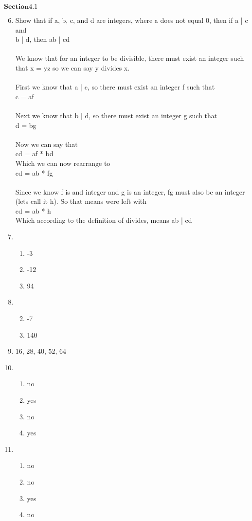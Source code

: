 \documentclass[12pt, letter paper]{article}
\begin{document}
$\mathbf{Section 4.1}$
\begin{enumerate}
	\setcounter{enumi}{5}
	\item Show that if a, b, c, and d are integers, where a does not equal 0, then if  a | c and\\ b | d, then ab | cd
	\\
	\\We know that for an integer to be divisible, there must exist an integer such that x = yz so we can say y 		divides x.
	\\
	\\First we know that a | c, so there must exist an integer f such that
	\\c = af
	\\
	\\Next we know that b | d, so there must exist an integer g such that
	\\d = bg
	\\
	\\Now we can say that 
	\\cd = af * bd
	\\Which we can now rearrange to
	\\cd = ab * fg
	\\
	\\Since we know f is and integer and g is an integer, fg must also be an integer (lets call it h). So that means 	were left with
	\\cd = ab * h
	\\Which according to the definition of divides, means ab | cd
	
	\setcounter{enumi}{23}
	\item
	\begin{enumerate}
		\item -3
		\item -12
		\item 94
	\end{enumerate}
	
	\item
	\begin{enumerate}
		\setcounter{enumii}{1}
		\item -7
		\item 140
	\end{enumerate}
	
	\item 16, 28, 40, 52, 64
	
	\setcounter{enumi}{27}
	\item
	\begin{enumerate}
		\item no
		\item yes
		\item no
		\item yes
	\end{enumerate}
	
	\item
	\begin{enumerate}
		\item no
		\item no
		\item yes
		\item no
	\end{enumerate}

\end{enumerate}
\end{document}
